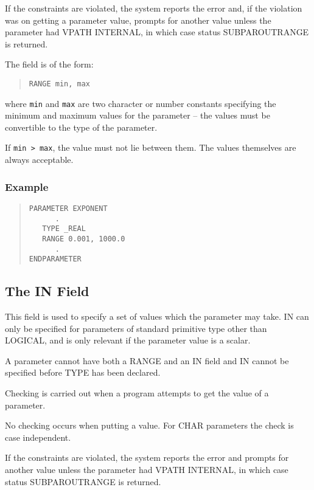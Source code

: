 \documentclass[twoside,11pt]{article}
\newcommand{\xlabel}[1]{}
\renewcommand{\_}{\texttt{\symbol{95}}}
\begin{document}
If the constraints are violated, the system reports the error and, if the
violation was on getting a parameter value, prompts for
another value unless the parameter had VPATH INTERNAL, in which case status 
SUBPAR\_\_OUTRANGE is returned.

The field is of the form:
\begin{quote} \begin{verbatim}
RANGE min, max
\end{verbatim} \end{quote}
where \texttt{min} and \texttt{max} are two character or number
constants specifying the minimum and maximum values for the parameter -- the 
values must be convertible to the type of the parameter.

If \texttt{min > max}, the value must not lie between them. The values themselves
are always acceptable.

\subsubsection*{Example}
\begin{quote} \begin{verbatim}
PARAMETER EXPONENT
      .
   TYPE _REAL
   RANGE 0.001, 1000.0
      .
ENDPARAMETER
\end{verbatim} \end{quote}

\subsection{The IN Field\xlabel{the_in_field}}

This field is used to specify a set of values which the parameter may take.
IN can only be specified for parameters of standard primitive type other
than \_LOGICAL, and is only relevant if the parameter value is a scalar.

A parameter cannot have both a RANGE and an IN field and IN cannot be specified
before TYPE has been declared. 

Checking is carried out when a program attempts to get the value of a 
parameter.

No checking occurs when putting a value.
For \_CHAR parameters the check is case independent.

If the constraints are violated, the system reports the error and prompts for
another value unless the parameter had VPATH INTERNAL, in which case status 
SUBPAR\_\_OUTRANGE is returned.
\end{document}
